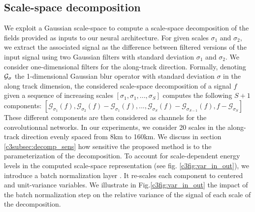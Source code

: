 \begin{bibunit}
 
\subsection*{Scale-space decomposition}
\label{c3subsec:scale_decomp}


We exploit a Gaussian scale-space to compute a scale-space decomposition of the fields provided as inputs to our neural architecture. For given scales $\sigma_1$ and $\sigma_2$, we extract the associated signal as the difference between filtered versions of the input signal using two Gaussian filters with standard deviation $\sigma_1$ and $\sigma_2$. We consider one-dimensional filters for the along-track direction. Formally, denoting 
 $\cal{G_{\sigma}}$ the 1-dimensional Gaussian blur operator with standard deviation $\sigma$ in the along track dimension, the considered scale-space decomposition of a signal $f$ given a sequence of increasing scales $[\sigma_1, \sigma_1, ..., \sigma_S]$ computes the following $S+1$ components: $[\mathcal{G}_{\sigma_1}(f), \mathcal{G}_{\sigma_2}(f) - \mathcal{G}_{\sigma_1}(f),...,\mathcal{G}_{\sigma_S}(f) - \mathcal{G}_{\sigma_{S-1}}(f), f - \mathcal{G}_{\sigma_S}]$
These different components are then considered as channels for the convolutionnal networks. In our experiments, we consider 20 scales in the along-track direction evenly spaced from 8km to 160km. We discuss in section \ref{c3subsec:decomp_sens} how sensitive the proposed method is to the parameterization of the decomposition.
To account for scale-dependent energy levels in the computed scale-space representation (see fig. \ref{c3fig:var_in_out}), we introduce a batch normalization layer \cite{Ioffe_Szegedy_2015}. It re-scales each component to centered and unit-variance variables.
We illustrate in Fig.\ref{c3fig:var_in_out} the impact of the batch normalization step on the relative variance of the signal of each scale of the decomposition.


\end{bibunit}
